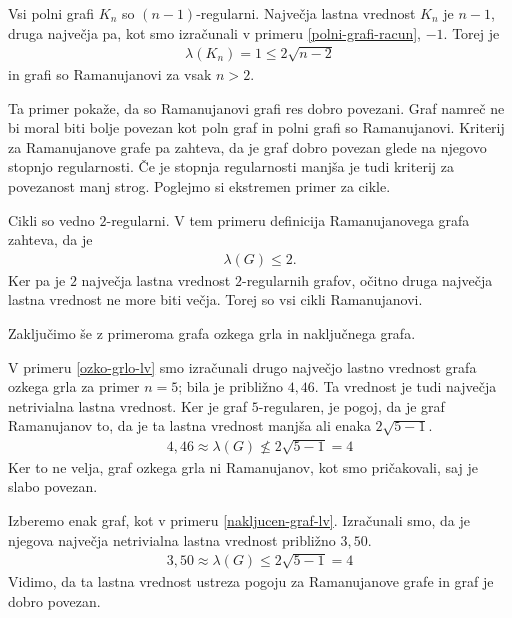 \begin{primer}
    Vsi polni grafi \(K_n\) so \((n-1)\)-regularni. Največja lastna vrednost \(K_n\) je \(n-1\), druga največja pa, kot smo izračunali v primeru \ref{polni-grafi-racun}, \(-1\). Torej je
    \begin{align*}
        \lambda(K_n) = 1 \leq 2\sqrt{n-2}
    \end{align*}
    in grafi so Ramanujanovi za vsak \(n>2\).
\end{primer}
Ta primer pokaže, da so Ramanujanovi grafi res dobro povezani. Graf namreč ne bi moral biti bolje povezan kot poln graf in polni grafi so Ramanujanovi. Kriterij za Ramanujanove grafe pa zahteva, da je graf dobro povezan glede na njegovo stopnjo regularnosti. Če je stopnja regularnosti manjša je tudi kriterij za povezanost manj strog. Poglejmo si ekstremen primer za cikle.
\begin{primer}[Cikli]
    Cikli so vedno \(2\)-regularni. V tem primeru definicija Ramanujanovega grafa zahteva, da je
    \begin{align*}
        \lambda(G) \leq 2.
    \end{align*}
    Ker pa je \(2\) največja lastna vrednost \(2\)-regularnih grafov, očitno druga največja lastna vrednost ne more biti večja. Torej so vsi cikli Ramanujanovi.
\end{primer}
Zaključimo še z primeroma grafa ozkega grla in naključnega grafa.
\begin{primer}
    V primeru \ref{ozko-grlo-lv} smo izračunali drugo največjo lastno vrednost grafa ozkega grla za primer \(n=5\); bila je približno \(4{,}46\). Ta vrednost je tudi največja netrivialna lastna vrednost. Ker je graf \(5\)-regularen, je pogoj, da je graf Ramanujanov to, da je ta lastna vrednost manjša ali enaka \(2\sqrt{5-1}\).
    \begin{align*}
       4{,}46 \approx \lambda(G) \not\leq 2\sqrt{5-1} = 4 
    \end{align*} 
    Ker to ne velja, graf ozkega grla ni Ramanujanov, kot smo pričakovali, saj je slabo povezan.
\end{primer}
\begin{primer}
    Izberemo enak graf, kot v primeru \ref{nakljucen-graf-lv}. Izračunali smo, da je njegova največja netrivialna lastna vrednost približno \(3{,}50\).
    \begin{align*}
        3{,}50 \approx \lambda(G) \leq 2\sqrt{5-1} = 4  
     \end{align*}
     Vidimo, da ta lastna vrednost ustreza pogoju za Ramanujanove grafe in graf je dobro povezan.
\end{primer}

